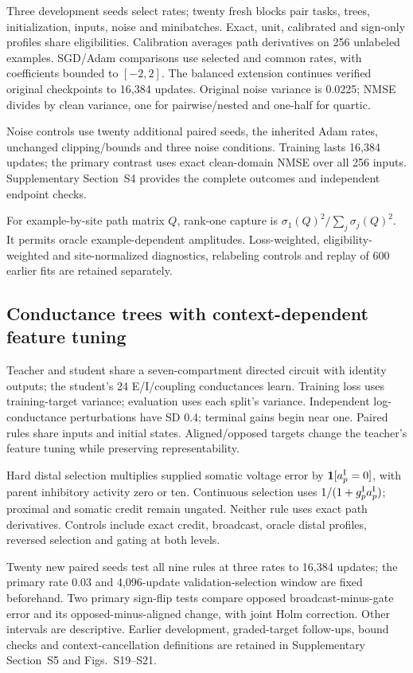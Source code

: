 \documentclass[11pt]{article}
\begin{document}
Three development seeds select rates; twenty fresh blocks pair tasks, trees, initialization, inputs, noise and minibatches. Exact, unit, calibrated and sign-only profiles share eligibilities. Calibration averages path derivatives on 256 unlabeled examples. SGD/Adam comparisons use selected and common rates, with coefficients bounded to $[-2,2]$. The balanced extension continues verified original checkpoints to 16,384 updates. Original noise variance is 0.0225; NMSE divides by clean variance, one for pairwise/nested and one-half for quartic.

Noise controls use twenty additional paired seeds, the inherited Adam rates, unchanged clipping/bounds and three noise conditions. Training lasts 16,384 updates; the primary contrast uses exact clean-domain NMSE over all 256 inputs. Supplementary Section~S4 provides the complete outcomes and independent endpoint checks.

For example-by-site path matrix $Q$, rank-one capture is $\sigma_1(Q)^2/\sum_j\sigma_j(Q)^2$. It permits oracle example-dependent amplitudes. Loss-weighted, eligibility-weighted and site-normalized diagnostics, relabeling controls and replay of 600 earlier fits are retained separately.



\subsection*{Conductance trees with context-dependent feature tuning}

Teacher and student share a seven-compartment directed circuit with identity outputs; the student's 24 E/I/coupling conductances learn. Training loss uses training-target variance; evaluation uses each split's variance. Independent log-conductance perturbations have SD 0.4; terminal gains begin near one. Paired rules share inputs and initial states. Aligned/opposed targets change the teacher's feature tuning while preserving representability.

Hard distal selection multiplies supplied somatic voltage error by $\mathbf1[a_p^{\rm I}=0]$, with parent inhibitory activity zero or ten. Continuous selection uses $1/(1+g_p^{\rm I}a_p^{\rm I})$; proximal and somatic credit remain ungated. Neither rule uses exact path derivatives. Controls include exact credit, broadcast, oracle distal profiles, reversed selection and gating at both levels.

Twenty new paired seeds test all nine rules at three rates to 16,384 updates; the primary rate 0.03 and 4,096-update validation-selection window are fixed beforehand. Two primary sign-flip tests compare opposed broadcast-minus-gate error and its opposed-minus-aligned change, with joint Holm correction. Other intervals are descriptive. Earlier development, graded-target follow-ups, bound checks and context-cancellation definitions are retained in Supplementary Section~S5 and Figs.~S19--S21.
\end{document}
